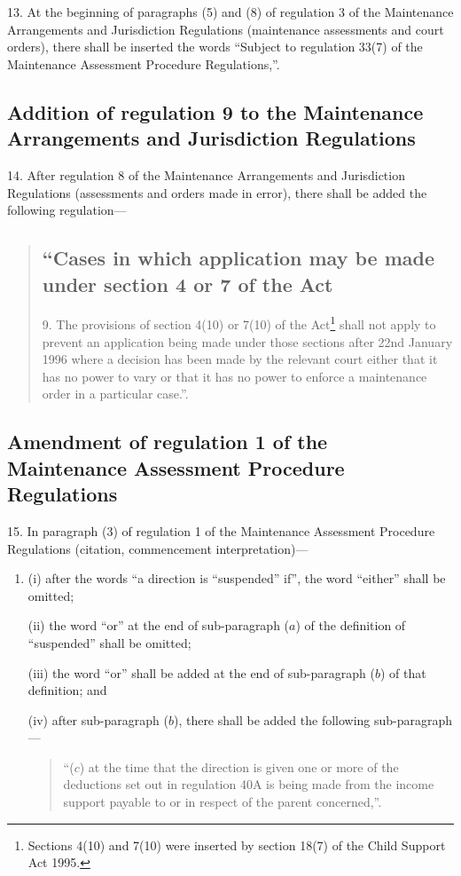 \documentclass[12pt,a4paper]{article}
\begin{document}
13.  At the beginning of paragraphs (5) and (8) of regulation 3 of the Maintenance Arrangements and Jurisdiction Regulations (maintenance assessments and court orders), there shall be inserted the words “Subject to regulation 33(7) of the Maintenance Assessment Procedure Regulations,”.

\subsection[14. Addition of regulation 9 to the Maintenance Arrangements and Jurisdiction Regulations]{Addition of regulation 9 to the Maintenance Arrangements and Jurisdiction Regulations}

14.  After regulation 8 of the Maintenance Arrangements and Jurisdiction Regulations (assessments and orders made in error), there shall be added the following regulation—
\begin{quotation}
\subsection*{“Cases in which application may be made under section 4 or 7 of the Act}

9.  The provisions of section 4(10) or 7(10) of the Act\footnote{\frenchspacing Sections 4(10) and 7(10) were inserted by section 18(7) of the Child Support Act 1995.} shall not apply to prevent an application being made under those sections after 22nd January 1996 where a decision has been made by the relevant court either that it has no power to vary or that it has no power to enforce a maintenance order in a particular case.”.
\end{quotation}

\subsection[15. Amendment of regulation 1 of the Maintenance Assessment Procedure Regulations]{\sloppy Amendment of regulation 1 of the Maintenance Assessment Procedure Regulations}

15.  In paragraph (3) of regulation 1 of the Maintenance Assessment Procedure Regulations (citation, commencement interpretation)—
\begin{enumerate}\item[]
(i) after the words “a direction is “suspended” if”, the word “either” shall be omitted;

(ii) the word “or” at the end of sub-paragraph ($a$) of the definition of “suspended” shall be omitted;

(iii) the word “or” shall be added at the end of sub-paragraph ($b$) of that definition; and

(iv) after sub-paragraph ($b$), there shall be added the following sub-paragraph—
\begin{quotation}
“($c$) at the time that the direction is given one or more of the deductions set out in regulation 40A is being made from the income support payable to or in respect of the parent concerned,”.
\end{quotation}
\end{enumerate}
\end{document}
